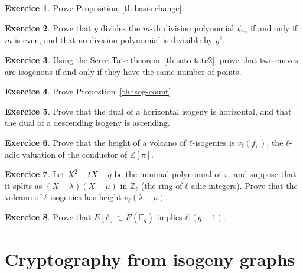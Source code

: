 \documentclass[10pt]{article}
\theoremstyle{plain}
\theoremstyle{definition}
\newtheorem{exercice}{Exercice}[part]
\def\F{\ensuremath{\mathbb{F}}}
\begin{document}
\begin{exercice}
  Prove Proposition~\ref{th:basis-change}.
\end{exercice}

\begin{exercice}
  Prove that $y$ divides the $m$-th division polynomial $ψ_m$ if and
  only if $m$ is even, and that no division polynomial is divisible by
  $y^2$.
\end{exercice}

\begin{exercice}
  Using the Serre-Tate theorem~\ref{th:sato-tate2}, prove that two
  curves are isogenous if and only if they have the same number of
  points.
\end{exercice}

\begin{exercice}
  Prove Propostion~\ref{th:isog-count}.
\end{exercice}

\begin{exercice}
  Prove that the dual of a horizontal isogeny is horizontal, and that
  the dual of a descending isogeny is ascending.
\end{exercice}

\begin{exercice}
  Prove that the height of a volcano of $ℓ$-isogenies is $v_ℓ(f_π)$,
  the $ℓ$-adic valuation of the conductor of $ℤ[π]$.
\end{exercice}

\begin{exercice}
  Let $X^2-tX-q$ be the minimal polynomial of $π$, and suppose that it
  splits as $(X-λ)(X-μ)$ in $ℤ_ℓ$ (the ring of $ℓ$-adic integers). %
  Prove that the volcano of $ℓ$ isogenies has height $v_ℓ(λ-μ)$.
\end{exercice}

\begin{exercice}
  \label{ex:group-struct}
  Prove that $E[ℓ]⊂E(\F_q)$ implies $ℓ|(q-1)$.
\end{exercice}


\clearpage
\part{Cryptography from isogeny graphs }

\end{document}
